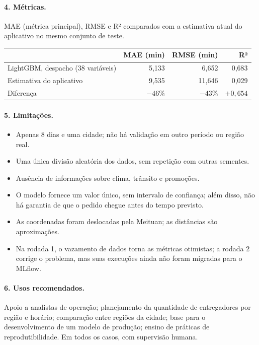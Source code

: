 \documentclass[11pt,a4paper]{article}
\begin{document}
\paragraph{4. Métricas.} MAE (métrica principal), RMSE e R² comparados com a estimativa
atual do aplicativo no mesmo conjunto de teste.

\begin{table}[H]
\centering\small
\begin{tabular}{l r r r}
\toprule
& MAE (min) & RMSE (min) & R² \\
\midrule
LightGBM, despacho (38 variáveis) & 5,133 & 6,652 & 0,683 \\
Estimativa do aplicativo & 9,535 & 11,646 & 0,029 \\
Diferença & $-46\%$ & $-43\%$ & $+0{,}654$ \\
\bottomrule
\end{tabular}
\end{table}

\paragraph{5. Limitações.}
\begin{itemize}
  \item Apenas 8 dias e uma cidade; não há validação em outro período ou região real.
  \item Uma única divisão aleatória dos dados, sem repetição com outras sementes.
  \item Ausência de informações sobre clima, trânsito e promoções.
  \item O modelo fornece um valor único, sem intervalo de confiança; além disso, não há garantia de que o pedido
        chegue antes do tempo previsto.
  \item As coordenadas foram deslocadas pela Meituan; as distâncias são aproximações.
  \item Na rodada 1, o vazamento de dados torna as métricas otimistas; a rodada 2 corrige o
        problema, mas suas execuções ainda não foram migradas para o MLflow.
\end{itemize}

\paragraph{6. Usos recomendados.} Apoio a analistas de operação; planejamento da quantidade de
entregadores por região e horário; comparação entre regiões da cidade; base para o
desenvolvimento de um modelo de produção; ensino de práticas de reprodutibilidade. Em todos
os casos, com supervisão humana.
\end{document}
